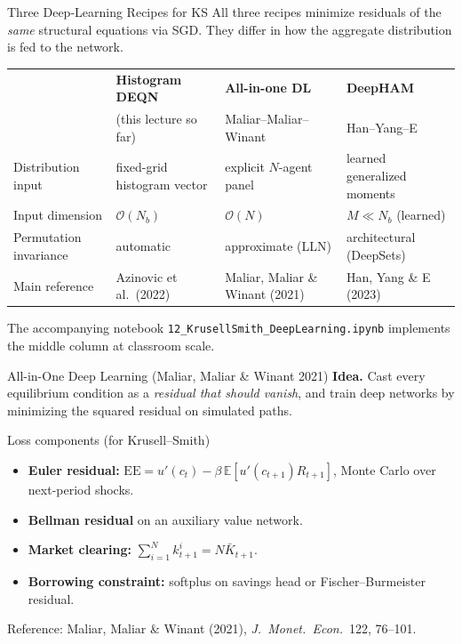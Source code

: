 \documentclass[aspectratio=169,11pt]{beamer}
\newcommand{\emphc}[1]{\textcolor{harvardcrimson}{#1}}
\newcommand{\E}[1]{\mathbb{E}\!\left[#1\right]}
\begin{document}
\begin{frame}{Three Deep-Learning Recipes for KS}
\small
All three recipes minimize residuals of the \emph{same} structural equations via SGD.  They differ in how the aggregate distribution is fed to the network.

\vspace{0.4em}
\begin{center}
\scriptsize
\begin{tabular}{p{2.8cm} p{3.2cm} p{2.8cm} p{3.0cm}}
\toprule
 & \textbf{Histogram DEQN} & \textbf{All-in-one DL} & \textbf{DeepHAM} \\
 & (this lecture so far) & Maliar--Maliar--Winant & Han--Yang--E \\
\midrule
Distribution input & fixed-grid histogram vector & explicit $N$-agent panel & learned generalized moments \\
\addlinespace
Input dimension & $\mathcal{O}(N_b)$ & $\mathcal{O}(N)$ & $M \ll N_b$ (learned) \\
\addlinespace
Permutation invariance & automatic & approximate (LLN) & \emphc{architectural} (DeepSets) \\
\addlinespace
Main reference & Azinovic et al.\ (2022) & Maliar, Maliar \& Winant (2021) & Han, Yang \& E (2023) \\
\bottomrule
\end{tabular}
\end{center}

\vspace{0.3em}
{\footnotesize The accompanying notebook \texttt{12\_KrusellSmith\_DeepLearning.ipynb} implements the middle column at classroom scale.}
\end{frame}

\begin{frame}{All-in-One Deep Learning (Maliar, Maliar \& Winant 2021)}
\small
\textbf{Idea.}  Cast every equilibrium condition as a \emph{residual that should vanish}, and train deep networks by minimizing the squared residual on simulated paths.

\vspace{0.4em}
\begin{block}{Loss components (for Krusell--Smith)}
\footnotesize
\begin{itemize}\itemsep1pt
    \item \textbf{Euler residual:} $\mathrm{EE} = u'(c_t) - \beta\,\E{u'(c_{t+1}) R_{t+1}}$, Monte Carlo over next-period shocks.
    \item \textbf{Bellman residual} on an auxiliary value network.
    \item \textbf{Market clearing:} $\sum_{i=1}^N k_{t+1}^i = N\bar K_{t+1}$.
    \item \textbf{Borrowing constraint:} softplus on savings head or Fischer--Burmeister residual.
\end{itemize}
\end{block}

\vspace{0.4em}
{\scriptsize Reference: Maliar, Maliar \& Winant (2021), \emph{J.\ Monet.\ Econ.}\ 122, 76--101.}
\end{frame}
\end{document}
